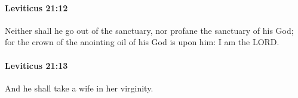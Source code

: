 		\paragraph{Leviticus 21:12} %
			\label{LEVITICUS-21-12}

			Neither shall he go out of the sanctuary, nor profane the sanctuary of his God; for the crown of the anointing oil of his God is upon him: I am the LORD.


		\paragraph{Leviticus 21:13} %
			\label{LEVITICUS-21-13}

			And he shall take a wife in her virginity.


